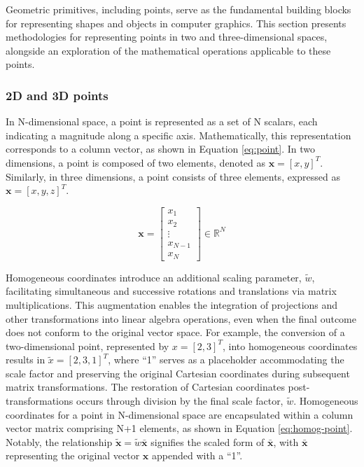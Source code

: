 Geometric primitives, including points, serve as the fundamental building blocks for representing shapes and objects in computer graphics.
This section presents methodologies for representing points in two and three-dimensional spaces, alongside an exploration of the mathematical operations applicable to these points.

\subsubsection{2D and 3D points}
\label{sec:geometric-points}
In N-dimensional space, a point is represented as a set of N scalars, each indicating a magnitude along a specific axis.
Mathematically, this representation corresponds to a column vector, as shown in Equation \ref{eq:point}.
In two dimensions, a point is composed of two elements, denoted as $\mathbf{x} = [x , y]^{T}$.
Similarly, in three dimensions, a point consists of three elements, expressed as $\mathbf{x} = [x , y , z]^{T}$.

\begin{equation}
    \mathbf{x} = \begin{bmatrix}
        x_1 \\ x_2 \\ \vdots \\ x_{N-1} \\ x_N
    \end{bmatrix} \in \mathbb{R}^N
    \label{eq:point}
\end{equation}


Homogeneous coordinates introduce an additional scaling parameter, $\tilde{w}$, facilitating simultaneous and successive rotations and translations via matrix multiplications.
This augmentation enables the integration of projections and other transformations into linear algebra operations, even when the final outcome does not conform to the original vector space.
For example, the conversion of a two-dimensional point, represented by $x = [2,3]^{T}$, into homogeneous coordinates results in $\tilde{x} = [2,3,1]^{T}$, where ``1'' serves as a placeholder accommodating the scale factor and preserving the original Cartesian coordinates during subsequent matrix transformations.
The restoration of Cartesian coordinates post-transformations occurs through division by the final scale factor, $\tilde{w}$.
Homogeneous coordinates for a point in N-dimensional space are encapsulated within a column vector matrix comprising N+1 elements, as shown in Equation \ref{eq:homog-point}.
Notably, the relationship $\mathbf{\tilde{x}} = \tilde{w}\mathbf{\bar{x}}$ signifies the scaled form of $\bar{\mathbf{x}}$, with $\bar{\mathbf{x}}$ representing the original vector $\mathbf{x}$ appended with a ``1''.

